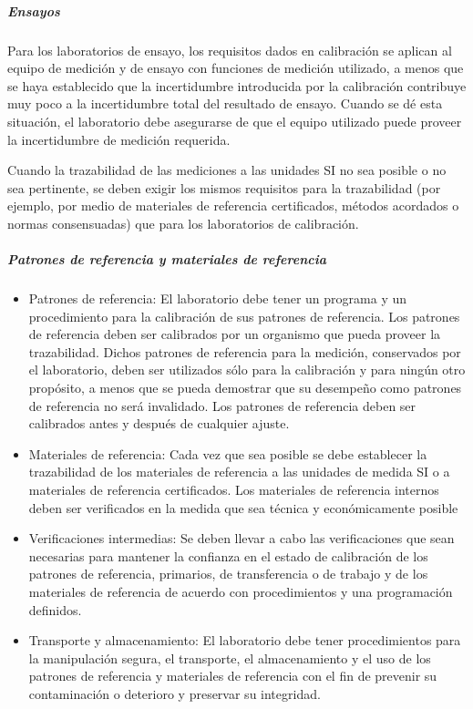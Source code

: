 \subparagraph{Ensayos}
\par 
Para los laboratorios de ensayo, los requisitos dados en calibración se aplican al equipo de medición
y de ensayo con funciones de medición utilizado, a menos que se haya establecido que la incertidumbre
introducida por la calibración contribuye muy poco a la incertidumbre total del resultado de ensayo. Cuando
se dé esta situación, el laboratorio debe asegurarse de que el equipo utilizado puede proveer la incertidumbre
de medición requerida.

\par \noindent
Cuando la trazabilidad de las mediciones a las unidades SI no sea posible o no sea pertinente,
se deben exigir los mismos requisitos para la trazabilidad (por ejemplo, por medio de materiales de referencia
certificados, métodos acordados o normas consensuadas) que para los laboratorios de calibración.

\subparagraph{Patrones de referencia y materiales de referencia}
\begin{itemize}
	\item Patrones de referencia: El laboratorio debe tener un programa y un procedimiento para la calibración de sus patrones de referencia.
	Los patrones de referencia deben ser calibrados por un organismo que pueda proveer la trazabilidad. Dichos patrones de referencia para la medición, conservados por el laboratorio, deben ser
	utilizados sólo para la calibración y para ningún otro propósito, a menos que se pueda demostrar que su
	desempeño como patrones de referencia no será invalidado. Los patrones de referencia deben ser calibrados
	antes y después de cualquier ajuste.
	
	\item Materiales de referencia: Cada vez que sea posible se debe establecer la trazabilidad de los materiales de referencia a las unidades de
	medida SI o a materiales de referencia certificados. Los materiales de referencia internos deben ser
	verificados en la medida que sea técnica y económicamente posible
	
	\item Verificaciones intermedias: Se deben llevar a cabo las verificaciones que sean necesarias para mantener la confianza en el estado de
	calibración de los patrones de referencia, primarios, de transferencia o de trabajo y de los materiales de
	referencia de acuerdo con procedimientos y una programación definidos.
	
	\item Transporte y almacenamiento: El laboratorio debe tener procedimientos para la manipulación segura, el transporte, el almacenamiento y el
	uso de los patrones de referencia y materiales de referencia con el fin de prevenir su contaminación o
	deterioro y preservar su integridad.
\end{itemize}

